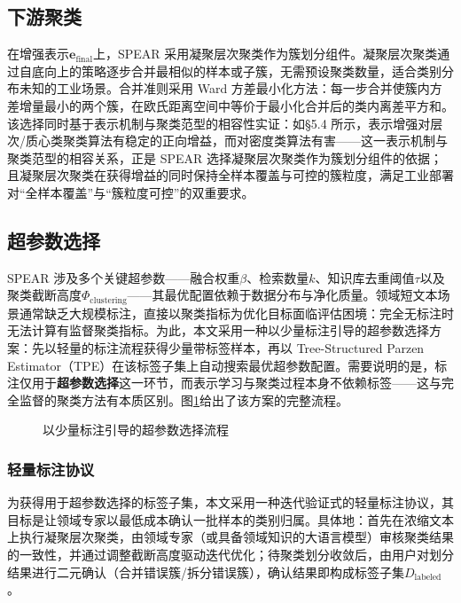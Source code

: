 \documentclass[10.5pt,compsoc,UTF8]{CjC}
\theoremstyle{mystyle}
\begin{document}
{\heiti \subsection{下游聚类}}

在增强表示$\mathbf{e}_{\text{final}}$上，SPEAR 采用凝聚层次聚类作为簇划分组件。凝聚层次聚类通过自底向上的策略逐步合并最相似的样本或子簇，无需预设聚类数量，适合类别分布未知的工业场景。合并准则采用 Ward 方差最小化方法：每一步合并使簇内方差增量最小的两个簇，在欧氏距离空间中等价于最小化合并后的类内离差平方和。该选择同时基于表示机制与聚类范型的相容性实证：如\S 5.4 所示，表示增强对层次/质心类聚类算法有稳定的正向增益，而对密度类算法有害——这一表示机制与聚类范型的相容关系，正是 SPEAR 选择凝聚层次聚类作为簇划分组件的依据；且凝聚层次聚类在获得增益的同时保持全样本覆盖与可控的簇粒度，满足工业部署对``全样本覆盖''与``簇粒度可控''的双重要求。

{\heiti \subsection{超参数选择}}

SPEAR 涉及多个关键超参数——融合权重$\beta$、检索数量$k$、知识库去重阈值$\tau$以及聚类截断高度$\Phi_{\text{clustering}}$——其最优配置依赖于数据分布与净化质量。领域短文本场景通常缺乏大规模标注，直接以聚类指标为优化目标面临评估困境：完全无标注时无法计算有监督聚类指标。为此，本文采用一种以少量标注引导的超参数选择方案：先以轻量的标注流程获得少量带标签样本，再以 Tree-Structured Parzen Estimator（TPE）\cite{bergstra2011}在该标签子集上自动搜索最优超参数配置。需要说明的是，标注仅用于\textbf{超参数选择}这一环节，而表示学习与聚类过程本身不依赖标签——这与完全监督的聚类方法有本质区别。图\ref{fig:tpe_flow}给出了该方案的完整流程。

\begin{figure}[H]
  \centering
  \resizebox{\linewidth}{!}{}
  \caption{以少量标注引导的超参数选择流程}
  \label{fig:tpe_flow}
\end{figure}

\subsubsection{轻量标注协议}

为获得用于超参数选择的标签子集，本文采用一种迭代验证式的轻量标注协议，其目标是让领域专家以最低成本确认一批样本的类别归属。具体地：首先在浓缩文本上执行凝聚层次聚类，由领域专家（或具备领域知识的大语言模型）审核聚类结果的一致性，并通过调整截断高度驱动迭代优化；待聚类划分收敛后，由用户对划分结果进行二元确认（合并错误簇/拆分错误簇），确认结果即构成标签子集$D_{\text{labeled}}$。
\end{document}
